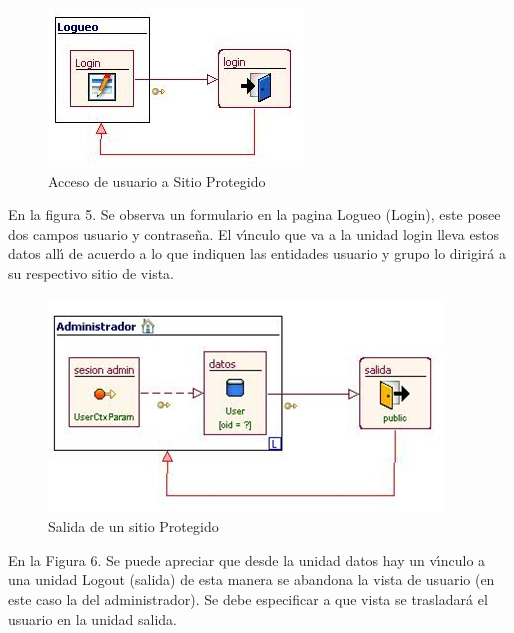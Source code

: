 \begin{figure}[H]
    \centering
    \includegraphics[scale=1]{resourse/login.jpg}
    \caption{Acceso de usuario a Sitio Protegido}
    \label{TFig:05}
\end{figure} 


En la figura 5. Se observa un formulario en la pagina Logueo (Login),
este posee dos campos usuario y contrase\~na. El v\'{\i}nculo que va a la unidad 
login lleva estos datos all\'{\i} de acuerdo a lo que indiquen las entidades 
usuario y grupo lo dirigir\'a a su respectivo sitio de vista.

\begin{figure}[H]
    \centering
    \includegraphics[scale=1]{resourse/logout.jpg}
    \caption{Salida de un sitio Protegido}
    \label{TFig:06}
\end{figure} 

En la Figura 6. Se puede apreciar que desde la unidad datos hay un v\'{\i}nculo a 
una unidad Logout (salida) de esta manera se abandona la vista de usuario 
(en este caso la del administrador). Se debe especificar a que vista se 
trasladar\'a el usuario en la unidad salida.


